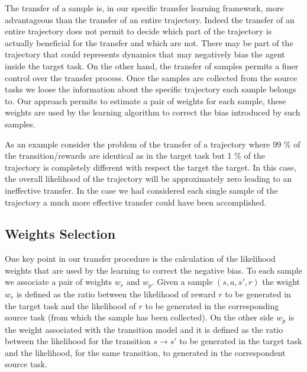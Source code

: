   \noindent The transfer of a sample is, in our specific transfer learning framework, more advantageous
  than the transfer of an entire trajectory. Indeed the transfer of an entire trajectory does not
  permit to decide which part of the trajectory is actually beneficial for the transfer and which are not.
  There may be part of the trajectory that could represents dynamics that may negatively bias the agent
  inside the target task.\newline
  On the other hand, the transfer of samples permits a finer control over the transfer process.
  Once the samples are collected from the source tasks we loose the information about the specific
  trajectory each sample belongs to. Our approach permits to estimate a pair of weights for each sample,
  these weights are used by the learning algorithm to correct the bias introduced by such samples.\newline

  \noindent As an example consider the problem of the transfer of a trajectory where 99 \% of the
  transition/rewards are identical as in the target task but 1 \% of the trajectory is completely
  different with respect the target the target. In this case, the overall likelihood of the trajectory
  will be approximately zero leading to an ineffective transfer. In the case we had considered each
  single sample of the trajectory a much more effective transfer could have been accomplished.

\subsection{Weights Selection}
  \noindent One key point in our transfer procedure is the calculation of the likelihood weights that are used by the
  learning to correct the negative bias. To each sample we associate a pair of weights $w_r$ and $w_p$.
  Given a sample $(s,a,s',r)$ the weight $w_r$ is defined as the ratio between the likelihood of reward $r$
  to be generated in the target task and the likelihood of $r$ to be generated in the corresponding source task
  (from which the sample has been collected). On the other side $w_p$ is the weight associated with the
  transition model and it is defined as the ratio between the likelihood for the transition $s \rightarrow s'$ to
  be generated in the target task and the likelihood, for the same transition, to generated in the correspondent source
  task.\newline

